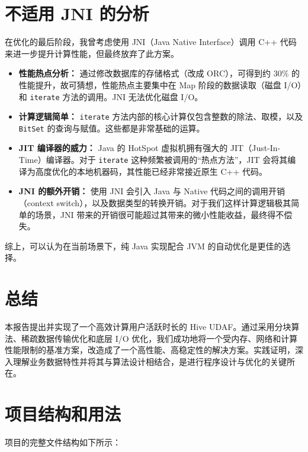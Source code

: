 \documentclass[UTF8]{ctexart}
\begin{document}
\section{不适用 JNI 的分析}
在优化的最后阶段，我曾考虑使用 JNI（Java Native Interface）调用 C++ 代码来进一步提升计算性能，但最终放弃了此方案。
\begin{itemize}
    \item \textbf{性能热点分析：} 通过修改数据库的存储格式（改成 ORC），可得到约 30\% 的性能提升，故可猜想，性能热点主要集中在 Map 阶段的数据读取（磁盘 I/O）和 \texttt{iterate} 方法的调用。JNI 无法优化磁盘 I/O。
    \item \textbf{计算逻辑简单：} \texttt{iterate} 方法内部的核心计算仅包含整数的除法、取模，以及 \texttt{BitSet} 的查询与赋值。这些都是非常基础的运算。
    \item \textbf{JIT 编译器的威力：} Java 的 HotSpot 虚拟机拥有强大的 JIT（Just-In-Time）编译器。对于 \texttt{iterate} 这种频繁被调用的“热点方法”，JIT 会将其编译为高度优化的本地机器码，其性能已经非常接近原生 C++ 代码。
    \item \textbf{JNI 的额外开销：} 使用 JNI 会引入 Java 与 Native 代码之间的调用开销（context switch），以及数据类型的转换开销。对于我们这样计算逻辑极其简单的场景，JNI 带来的开销很可能超过其带来的微小性能收益，最终得不偿失。
\end{itemize}
综上，可以认为在当前场景下，纯 Java 实现配合 JVM 的自动优化是更佳的选择。

\section{总结}
本报告提出并实现了一个高效计算用户活跃时长的 Hive UDAF。通过采用分块算法、稀疏数据传输优化和底层 I/O 优化，我们成功地将一个受内存、网络和计算性能限制的基准方案，改造成了一个高性能、高稳定性的解决方案。实践证明，深入理解业务数据特性并将其与算法设计相结合，是进行程序设计与优化的关键所在。

\newpage
\appendix
\section{项目结构和用法}

项目的完整文件结构如下所示：

\end{document}
